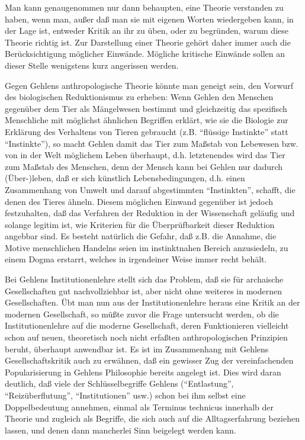 \documentclass[12pt,a4paper]{article}
\begin{document}
Man kann genaugenommen nur dann behaupten, eine Theorie verstanden zu
haben, wenn man, außer daß man sie mit eigenen Worten wiedergeben kann,
in der Lage ist, entweder Kritik an ihr zu üben, oder zu begründen,
warum diese Theorie richtig ist. Zur Darstellung einer Theorie gehört
daher immer auch die Berücksichtigung möglicher Einwände. Mögliche
kritische Einwände sollen an dieser Stelle wenigstens kurz angerissen
werden.

Gegen Gehlens anthropologische Theorie könnte man geneigt sein, den
Vorwurf des biologischen Reduktionismus zu erheben: Wenn Gehlen den
Menschen gegenüber dem Tier als Mängelwesen bestimmt und gleichzeitig
das spezifisch Menschliche mit möglichst ähnlichen Begriffen erklärt,
wie sie die Biologie zur Erklärung des Verhaltens von Tieren gebraucht
(z.B.  "`flüssige Instinkte"' statt "`Instinkte"'), so macht Gehlen
damit das Tier zum Maßstab von Lebewesen bzw. von in der Welt möglichem
Leben überhaupt, d.h.  letztenendes wird das Tier zum Maßstab des
Menschen, denn der Mensch kann bei Gehlen nur dadurch (Über-)leben, daß
er sich künstlich Lebensbedingungen, d.h. einen Zusammenhang von Umwelt
und darauf abgestimmten "`Instinkten"', schafft, die denen des Tieres
ähneln. Diesem möglichen Einwand gegenüber ist jedoch festzuhalten, daß
das Verfahren der Reduktion in der Wissenschaft geläufig und solange
legitim ist, wie Kriterien für die Überprüfbarkeit dieser Reduktion
angebbar sind. Es besteht natürlich die Gefahr, daß z.B. die Annahme,
die Motive menschlichen Handelns seien im instinktnahen Bereich
anzusiedeln, zu einem Dogma erstarrt, welches in irgendeiner Weise immer
recht behält.

Bei Gehlens Institutionenlehre stellt sich das Problem, daß sie für
archaische Gesellschaften gut nachvollziehbar ist, aber nicht ohne
weiteres in modernen Gesellschaften. Übt man nun aus der
Institutionenlehre heraus eine Kritik an der modernen Gesellschaft, so
müßte zuvor die Frage untersucht werden, ob die Institutionenlehre auf
die moderne Gesellschaft, deren Funktionieren vielleicht schon auf
neuen, theoretisch noch nicht erfaßten anthropologischen Prinzipien
beruht, überhaupt anwendbar ist. Es ist im Zusammenhang mit Gehlens
Gesellschaftskritik auch zu erwähnen, daß ein gewisser Zug der
vereinfachenden Popularisierung in Gehlens Philosophie bereits angelegt
ist. Dies wird daran deutlich, daß viele der Schlüsselbegriffe Gehlens
("`Entlastung"', "`Reizüberflutung"', "`Institutionen"' usw.) schon bei
ihm selbst eine Doppelbedeutung annehmen, einmal als Terminus technicus
innerhalb der Theorie und zugleich als Begriffe, die sich auch auf die
Alltagserfahrung beziehen lassen, und denen dann mancherlei Sinn
beigelegt werden kann.
\end{document}
